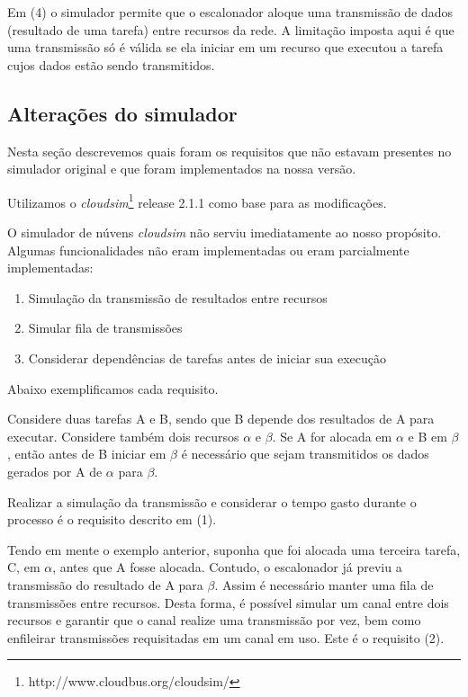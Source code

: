 \documentclass[a4paper,10pt]{article}
\begin{document}
Em (4) o simulador permite que o escalonador aloque uma transmissão de dados (resultado de uma tarefa)
entre recursos da rede. A limitação imposta aqui é que uma transmissão só é válida se ela iniciar em um
recurso que executou a tarefa cujos dados estão sendo transmitidos.

\subsection{Alterações do simulador}

Nesta seção descrevemos quais foram os requisitos que não estavam presentes no simulador original
e que foram implementados na nossa versão.

Utilizamos o \emph{cloudsim}\footnote{http://www.cloudbus.org/cloudsim/} release 2.1.1 como base para as modificações.
 
O simulador de núvens \emph{cloudsim} não serviu imediatamente ao nosso propósito. Algumas funcionalidades
não eram implementadas ou eram parcialmente implementadas:

\begin{enumerate}

  \item Simulação da transmissão de resultados entre recursos
  \item Simular fila de transmissões
  \item Considerar dependências de tarefas antes de iniciar sua execução

\end{enumerate}

Abaixo exemplificamos cada requisito.

Considere duas tarefas A e B, sendo que B depende dos resultados de A para executar.
Considere também dois recursos $\alpha$ e $\beta$.
Se A for alocada em $\alpha$ e B em $\beta$, então antes de B iniciar em $\beta$ é necessário
que sejam transmitidos os dados gerados por A de $\alpha$ para $\beta$.

Realizar a simulação da transmissão e considerar o tempo gasto durante o processo é o
requisito descrito em (1).

Tendo em mente o exemplo anterior, suponha que foi alocada uma terceira tarefa, C, em
$\alpha$, antes que A fosse alocada. Contudo, o escalonador já previu a transmissão do
resultado de A para $\beta$. Assim é necessário manter uma fila de transmissões entre
recursos. Desta forma, é possível simular um canal entre dois recursos e garantir que
o canal realize uma transmissão por vez, bem como enfileirar transmissões requisitadas
em um canal em uso. Este é o requisito (2).
\end{document}
